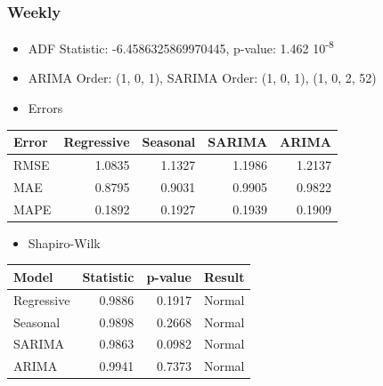 \documentclass[a4paper,12pt]{article}
\begin{document}
\subsubsection{Weekly}
\label{sec:org23dda29}
\begin{itemize}
\item ADF Statistic: -6.4586325869970445, p-value: 1.462 \texttimes{} 10\textsuperscript{-8}
\item ARIMA Order: (1, 0, 1), SARIMA Order: (1, 0, 1), (1, 0, 2, 52)
\item Errors
\end{itemize}
\begin{center}
\begin{tabular}{lrrrr}
Error & \textbf{Regressive} & Seasonal & SARIMA & ARIMA\\[0pt]
\hline
RMSE & 1.0835 & 1.1327 & 1.1986 & 1.2137\\[0pt]
MAE & 0.8795 & 0.9031 & 0.9905 & 0.9822\\[0pt]
MAPE & 0.1892 & 0.1927 & 0.1939 & 0.1909\\[0pt]
\end{tabular}
\end{center}
\begin{itemize}
\item Shapiro-Wilk
\end{itemize}
\begin{center}
\begin{tabular}{lrrl}
Model & Statistic & p-value & Result\\[0pt]
\hline
Regressive & 0.9886 & 0.1917 & Normal\\[0pt]
Seasonal & 0.9898 & 0.2668 & Normal\\[0pt]
SARIMA & 0.9863 & 0.0982 & Normal\\[0pt]
ARIMA & 0.9941 & 0.7373 & Normal\\[0pt]
\end{tabular}
\end{center}
\end{document}
